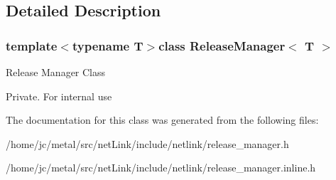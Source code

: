 \subsection{Detailed Description}
\subsubsection*{template$<$typename T$>$class Release\+Manager$<$ T $>$}

Release Manager Class

Private. For internal use 

The documentation for this class was generated from the following files\+:\begin{DoxyCompactItemize}
\item 
/home/jc/metal/src/net\+Link/include/netlink/release\+\_\+manager.\+h\item 
/home/jc/metal/src/net\+Link/include/netlink/release\+\_\+manager.\+inline.\+h\end{DoxyCompactItemize}
